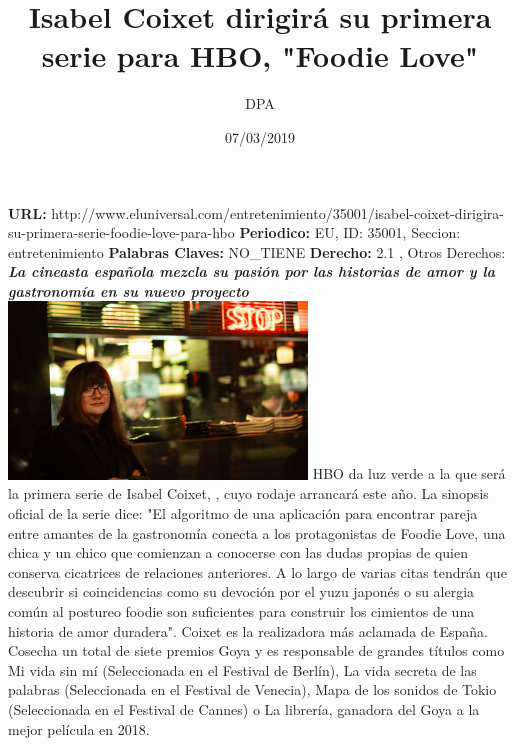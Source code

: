 \documentclass{article}%
\title{\textbf{Isabel Coixet dirigirá su primera serie para HBO, "Foodie Love"}}%
\author{DPA}%
\date{07/03/2019}%
\begin{document}
%
\normalsize%
\maketitle%
\textbf{URL: }%
http://www.eluniversal.com/entretenimiento/35001/isabel{-}coixet{-}dirigira{-}su{-}primera{-}serie{-}foodie{-}love{-}para{-}hbo\newline%
%
\textbf{Periodico: }%
EU, %
ID: %
35001, %
Seccion: %
entretenimiento\newline%
%
\textbf{Palabras Claves: }%
NO\_TIENE\newline%
%
\textbf{Derecho: }%
2.1%
, Otros Derechos: %
\newline%
%
\textbf{\textit{La cineasta española mezcla su pasión por las historias de amor y la gastronomía en su nuevo proyecto}}%
\newline%
\newline%
%
\includegraphics[width=300px]{EU_35001.jpg}%
\newline%
%
HBO da luz verde a la que será la primera serie de Isabel Coixet,%
\newline%
%
, cuyo rodaje arrancará este año.%
\newline%
%
La sinopsis oficial de la serie dice: "El algoritmo de una aplicación para encontrar pareja entre amantes de la gastronomía conecta a los protagonistas de Foodie Love, una chica y un chico que comienzan a conocerse con las dudas propias de quien conserva cicatrices de relaciones anteriores. A lo largo de varias citas tendrán que descubrir si coincidencias como su devoción por el yuzu japonés o su alergia común al postureo foodie son suficientes para construir los cimientos de una historia de amor duradera".%
\newline%
%
Coixet es la realizadora más aclamada de España. Cosecha un total de siete premios Goya y es responsable de grandes títulos como Mi vida sin mí (Seleccionada en el Festival de Berlín), La vida secreta de las palabras (Seleccionada en el Festival de Venecia), Mapa de los sonidos de Tokio (Seleccionada en el Festival de Cannes) o La librería, ganadora del Goya a la mejor película en 2018.%
\end{document}
